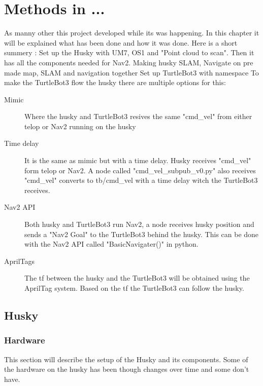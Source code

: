\chapter{Methods in ...}

As manny other  this project developed while its was happening. In this chapter it will be explained what has been done and how it was done. Here is a short summery : 
Set up the Husky with UM7, OS1 and "Point cloud to scan". Then it has all the components needed for Nav2. 
Making husky SLAM, Navigate on pre made map, SLAM and navigation together 
Set up TurtleBot3 with namespace 
To make the TurtleBot3 flow the husky there are multiple options for this: 

\begin{description}
   \item[Mimic] Where the husky and TurtleBot3 resives the same "cmd\_vel" from either telop or Nav2 running on the husky
   \item[Time delay] It is the same as mimic but with a time delay. Husky receives "cmd\_vel" form telop or Nav2. A node called "cmd\_vel\_subpub\_v0.py" also receives "cmd\_vel" converts to tb/cmd\_vel with a time delay witch the TurtleBot3 receives. 
   \item[Nav2 API] Both husky and TurtleBot3 run Nav2, a node receives husky position and sends a "Nav2 Goal" to the TurtleBot3 behind the husky. This can be done with the Nav2 API called "BasicNavigater()" in python.
   \item[AprilTags] The tf between the husky and the TurtleBot3 will be obtained using the AprilTag system. Based on the tf the TurtleBot3 can follow the husky. 
\end{description}


\section{Husky}
\subsection{Hardware}
This section will describe the setup of the Husky and its components. Some of the hardware on the husky has been though changes over time and some don't have. 

